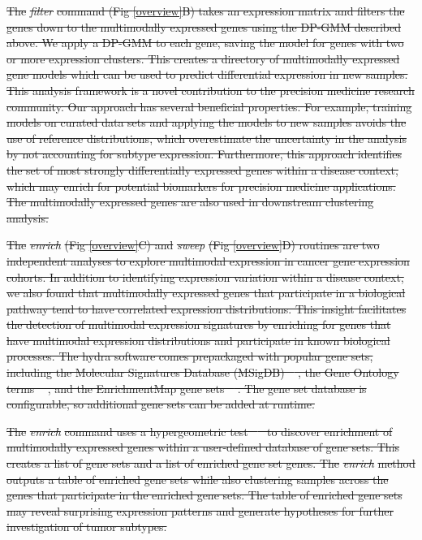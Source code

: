 \documentclass[10pt,letterpaper]{article}
\providecommand{\DIFdeltex}[1]{{\protect\color{red}\sout{#1}}}                      %
\providecommand{\DIFdel}[1]{\texorpdfstring{\DIFdeltex{#1}}{}} %
\begin{document}
\DIFdel{The }\textit{\DIFdel{filter}} %
\DIFdel{command (Fig \ref{overview}B) takes an expression matrix and filters the genes down to the multimodally expressed genes using the DP-GMM described above. We apply a DP-GMM to each gene, saving the model for genes with two or more expression clusters. This creates a directory of multimodally expressed gene models which can be used to predict differential expression in new samples. This analysis framework is a novel contribution to the precision medicine research community. Our approach has several beneficial properties. For example, training models on curated data sets and applying the models to new samples avoids the use of reference distributions, which overestimate the uncertainty in the analysis by not accounting for subtype expression. Furthermore, this approach identifies the set of most strongly differentially expressed genes within a disease context, which may enrich for potential biomarkers for precision medicine applications. The multimodally expressed genes are also used in downstream clustering analysis.
}%

\DIFdel{The }\textit{\DIFdel{enrich}} %
\DIFdel{(Fig \ref{overview}C) and }\textit{\DIFdel{sweep}} %
\DIFdel{(Fig \ref{overview}D) routines are two independent analyses to explore multimodal expression in cancer gene expression cohorts. In addition to identifying expression variation within a disease context, we also found that multimodally expressed genes that participate in a biological pathway tend to have correlated expression distributions. This insight facilitates the detection of multimodal expression signatures by enriching for genes that have multimodal expression distributions and participate in known biological processes. The hydra software comes prepackaged with popular gene sets, including the Molecular Signatures Database (MSigDB) \mbox{%
\cite{liberzonMolecularSignaturesDatabase2011}}\hspace{0pt}%
, the Gene Ontology terms \mbox{%
\cite{Ashburner2000, gene2018gene}}\hspace{0pt}%
, and the EnrichmentMap gene sets \mbox{%
\cite{merico2010enrichment}}\hspace{0pt}%
. The gene set database is configurable, so additional gene sets can be added at runtime.
}%

\DIFdel{The }\textit{\DIFdel{enrich}} %
\DIFdel{command uses a hypergeometric test \mbox{%
\cite{yuClusterProfilerPackageComparing2012} }\hspace{0pt}%
to discover enrichment of multimodally expressed genes within a user-defined database of gene sets. This creates a list of gene sets and a list of enriched gene set genes. The }\textit{\DIFdel{enrich}} %
\DIFdel{method outputs a table of enriched gene sets while also clustering samples across the genes that participate in the enriched gene sets. The table of enriched gene sets may reveal surprising expression patterns and generate hypotheses for further investigation of tumor subtypes.
}%
\end{document}
